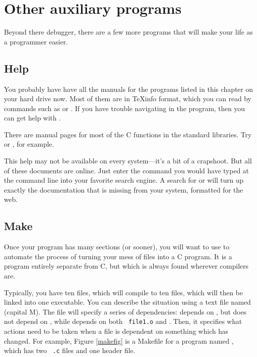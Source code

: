 \documentclass[12pt]{article}
\begin{document}
\section{\treesymbol Other auxiliary programs} 
Beyond there debugger, there
are a few more programs that will make your life as a programmer easier.

\subsection{Help} 
You probably have have all the manuals for the programs listed in this
chapter on your hard drive now. Most of them are in \TeX info format,
which you can read by commands such as  or . If
you have trouble navigating in the  program, then you can
get help with .

There are manual pages for most of the C functions in the standard
libraries. Try  or , for example.

This help may not be available on every system---it's a bit of
a crapshoot. But all of these documents are online. Just enter the
command you would have typed at the command line into your favorite
search engine. A search for  or  will
turn up exactly the documentation that is missing from your system,
formatted for the web.

\subsection{Make} \label{make} 
Once your program has many sections (or sooner), you will want to use
 to automate the process of turning your mess of files into
a C program.  It is a program entirely separate from C, but which
is always found wherever compilers are.

Typically, you have ten  files, which will compile
to ten  files, which will then be linked into one executable.
You can describe the situation using a
text file named  (capital M). The file will specify a
series of dependencies:  depends on , but does
not depend on , while  depends on both {\tt
file1.o} and .  Then, it specifies what actions need to be taken
when a file is dependent on something which has changed.  For example,
Figure \ref{makefig} is a Makefile for a program named , which has two {\tt
.c} files and one header file.
\end{document}
